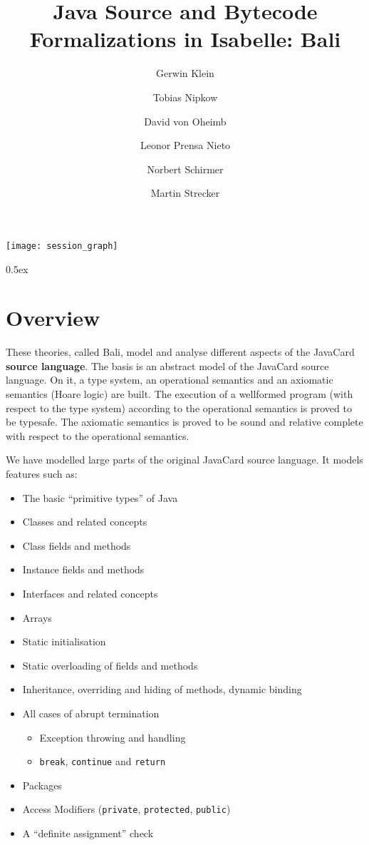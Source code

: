 \documentclass[11pt,a4paper]{book}
\begin{document}
\title{Java Source and Bytecode Formalizations in Isabelle: Bali}
\author{Gerwin Klein \and Tobias Nipkow \and David von Oheimb \and
  Leonor Prensa Nieto \and Norbert Schirmer \and Martin Strecker}
\maketitle

\tableofcontents

\begin{center}
  \texttt{[image: session\_graph]}
\end{center}

\parindent 0pt\parskip 0.5ex
\chapter{Overview}
These theories, called Bali,  model and analyse different aspects of the 
JavaCard \textbf{source language}. 
The basis is an abstract model of the JavaCard source language. 
On it, a type system, an operational semantics and an axiomatic semantics 
(Hoare logic) are built. The execution of a wellformed program (with respect to
the type system) according to the operational semantics is proved to be 
typesafe. The axiomatic semantics is proved to be sound and relative complete 
with respect to the operational semantics.

We have modelled large parts of the original JavaCard source language. It models
features such as:
\begin{itemize}
\item The basic ``primitive types'' of Java 
\item Classes and related concepts 
\item Class fields and methods
\item Instance fields and methods
\item Interfaces and related concepts 
\item Arrays
\item Static initialisation
\item Static overloading of fields and methods
\item Inheritance, overriding and hiding of methods, dynamic binding
\item All cases of abrupt termination
      \begin{itemize}
        \item Exception throwing and handling
        \item \texttt{break}, \texttt{continue} and \texttt{return} 
      \end{itemize}
\item Packages
\item Access Modifiers (\texttt{private}, \texttt{protected}, \texttt{public})
\item A ``definite assignment'' check
\end{itemize}
\end{document}
